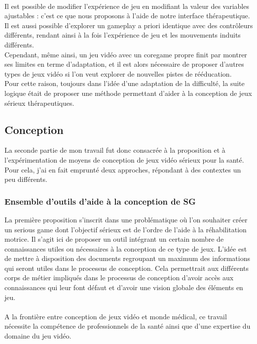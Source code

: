 \paragraph{}
Il est possible de modifier l'expérience de jeu en modifiant la valeur des variables ajustables : c'est ce que nous proposons à l'aide de notre interface thérapeutique. Il est aussi possible d'explorer un gameplay a priori identique avec des contrôleurs différents, rendant ainsi à la fois l'expérience de jeu et les mouvements induits différents.
\\Cependant, même ainsi, un jeu vidéo avec un coregame propre finit par montrer ses limites en terme d'adaptation, et il est alors nécessaire de proposer d'autres types de jeux vidéo si l'on veut explorer de nouvelles pistes de rééducation.\\
Pour cette raison, toujours dans l'idée d'une adaptation de la difficulté, la suite logique était de proposer une méthode permettant d'aider à la conception de jeux sérieux thérapeutiques.
 
\subsection{Conception}
	La seconde partie de mon travail fut donc consacrée à la proposition et à l'expérimentation de moyens de conception de jeux vidéo sérieux pour la santé. Pour cela, j'ai en fait emprunté deux approches, répondant à des contextes un peu différents.
	
	\subsubsection{Ensemble d'outils d'aide à la conception de SG}
	La première proposition s'inscrit dans une problématique où l'on souhaiter créer un serious game dont l'objectif sérieux est de l'ordre de l'aide à la réhabilitation motrice. Il s'agit ici de proposer un outil intégrant un certain nombre de connaissances utiles ou nécessaires à la conception de ce type de jeux. L'idée est de mettre à disposition des documents regroupant un maximum des informations qui seront utiles dans le processus de conception. Cela permettrait aux différents corps de métier impliqués dans le processus de conception d'avoir accès aux connaissances qui leur font défaut et d'avoir une vision globale des éléments en jeu.
	
		\paragraph{}
A la frontière entre conception de jeux vidéo et monde médical, ce travail nécessite la compétence de professionnels de la santé ainsi que d’une expertise du domaine du jeu vidéo.
